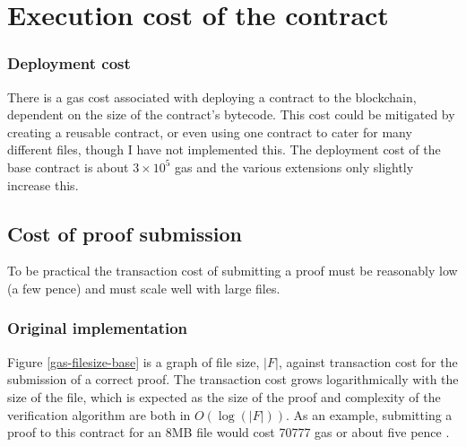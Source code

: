 \documentclass[12pt,a4paper,twoside,openright]{report}
\begin{document}
%
%



\section{Execution cost of the contract}

\subsubsection{Deployment cost}

There is a gas cost associated with deploying a contract to the blockchain, dependent on the size of the contract's bytecode.
This cost could be mitigated by creating a reusable contract, or even using one contract to cater for many different files, though I have not implemented this.
The deployment cost of the base contract is about $3 \times 10^5$ gas and the various extensions only slightly increase this.

\subsection{Cost of proof submission}

To be practical the transaction cost of submitting a proof must be reasonably low (a few pence)
and must scale well with large files.

\subsubsection{Original implementation}

Figure \ref{gas-filesize-base} is a graph of file size, $|F|$, against transaction cost for the submission of a correct proof.
The transaction cost grows logarithmically with the size of the file, which is expected as the size of the proof and complexity of the verification algorithm
are both in $O\left(\log\left(|F|\right)\right)$.
As an example, submitting a proof to this contract for an 8MB file would cost 70777 gas or about five pence .
\end{document}
